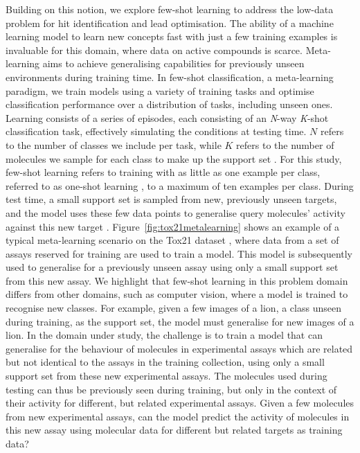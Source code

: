 Building on this notion, we explore few-shot learning to address the low-data problem for hit identification and lead optimisation. The ability of a machine learning model to learn new concepts fast with just a few training examples is invaluable for this domain, where data on active compounds is scarce. Meta-learning aims to achieve generalising capabilities for previously unseen environments during training time. In few-shot classification, a meta-learning paradigm, we train models using a variety of training tasks and optimise classification performance over a distribution of tasks, including unseen ones. Learning consists of a series of episodes, each consisting of an \textit{N}-way \textit{K}-shot classification task, effectively simulating the conditions at testing time. $N$ refers to the number of classes we include per task, while $K$ refers to the number of molecules we sample for each class to make up the support set \cite{snell2017prototypical}. For this study, few-shot learning refers to training with as little as one example per class, referred to as one-shot learning \cite{koch2015siamese, vinyals2016matching}, to a maximum of ten examples per class. During test time, a small support set is sampled from new, previously unseen targets, and the model uses these few data points to generalise query molecules' activity against this new target \cite{vinyals2016matching}. Figure~\ref{fig:tox21metalearning} shows an example of a typical meta-learning scenario on the Tox21 dataset \citep{huang2016tox21challenge}, where data from a set of assays reserved for training are used to train a model. This model is subsequently used to generalise for a previously unseen assay using only a small support set from this new assay. We highlight that few-shot learning in this problem domain differs from other domains, such as computer vision, where a model is trained to recognise new classes. For example, given a few images of a lion, a class unseen during training, as the support set, the model must generalise for new images of a lion. In the domain under study, the challenge is to train a model that can generalise for the behaviour of molecules in experimental assays which are related but not identical to the assays in the training collection, using only a small support set from these new experimental assays. The molecules used during testing can thus be previously seen during training, but only in the context of their activity for different, but related experimental assays. Given a few molecules from new experimental assays, can the model predict the activity of molecules in this new assay using molecular data for different but related targets as training data?

